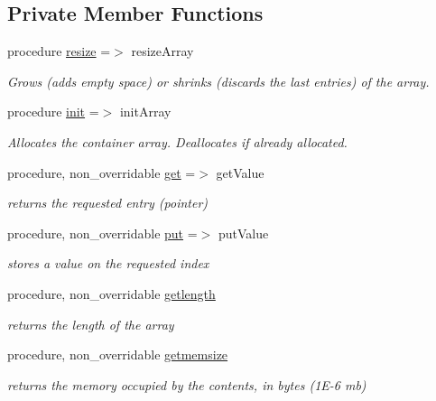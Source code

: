 \subsection*{Private Member Functions}
\begin{DoxyCompactItemize}
\item 
procedure \mbox{\hyperlink{structabstract__container__array__mod_1_1container__array_ac75fccc4c778eb745479dc50f46bf1fe}{resize}} =$>$ resize\+Array
\begin{DoxyCompactList}\small\item\em Grows (adds empty space) or shrinks (discards the last entries) of the array. \end{DoxyCompactList}\item 
procedure \mbox{\hyperlink{structabstract__container__array__mod_1_1container__array_acae485dab14440247585b9dd68d1211e}{init}} =$>$ init\+Array
\begin{DoxyCompactList}\small\item\em Allocates the container array. Deallocates if already allocated. \end{DoxyCompactList}\item 
procedure, non\+\_\+overridable \mbox{\hyperlink{structabstract__container__array__mod_1_1container__array_a9e7ee3cbe7bbcd28749369d010f8eb45}{get}} =$>$ get\+Value
\begin{DoxyCompactList}\small\item\em returns the requested entry (pointer) \end{DoxyCompactList}\item 
procedure, non\+\_\+overridable \mbox{\hyperlink{structabstract__container__array__mod_1_1container__array_a94dad1bae8974dd2a1dfe00059a9608c}{put}} =$>$ put\+Value
\begin{DoxyCompactList}\small\item\em stores a value on the requested index \end{DoxyCompactList}\item 
procedure, non\+\_\+overridable \mbox{\hyperlink{structabstract__container__array__mod_1_1container__array_ab91570b2196a2f5aafb0aa51a114b451}{getlength}}
\begin{DoxyCompactList}\small\item\em returns the length of the array \end{DoxyCompactList}\item 
procedure, non\+\_\+overridable \mbox{\hyperlink{structabstract__container__array__mod_1_1container__array_a098970225d71a3843fa74b360142457f}{getmemsize}}
\begin{DoxyCompactList}\small\item\em returns the memory occupied by the contents, in bytes (1\+E-\/6 mb) \end{DoxyCompactList}\end{DoxyCompactItemize}
